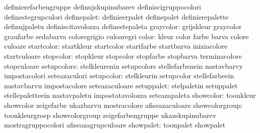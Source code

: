                                   definierefarbengruppe            definujskupinubarev
                                  definiscigruppocolori            definestegrupculori
                    definepalet:  definieerpalet                   definepalet
                                  definierepalette                 definujpaletu
                                  definiscitavolozza               definestepaleta
                      graycolor:  grijskleur                       graycolor
                                  graufarbe                        sedabarva
                                  coloregrigio                     culoaregri
                          color:  kleur                            color
                                  farbe                            barva
                                  colore                           culoare
                     startcolor:  startkleur                       startcolor
                                  startfarbe                       startbarva
                                  iniziacolore                     startculoare
                      stopcolor:  stopkleur                        stopcolor
                                  stopfarbe                        stopbarva
                                  terminacolore                    stopculoare
                    setupcolors:  stelkleurenin                    setupcolors
                                  stellefarbenein                  nastavbarvy
                                  impostacolori                    seteazaculori
                     setupcolor:  stelkleurin                      setupcolor
                                  stellefarbeein                   nastavbarvu
                                  impostacolore                    seteazaculoare
                     setuppalet:  stelpaletin                      setuppalet
                                  stellepaletteein                 nastavpaletu
                                  impostatavolozza                 seteazapaleta
                      showcolor:  toonkleur                        showcolor
                                  zeigefarbe                       ukazbarvu
                                  mostracolore                     afiseazaculoare
                 showcolorgroup:  toonkleurgroep                   showcolorgroup
                                  zeigefarbengruppe                ukazskupinubarev
                                  mostragruppocolori               afiseazagrupculoare
                      showpalet:  toonpalet                        showpalet
